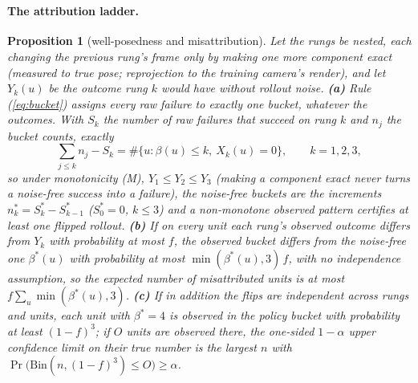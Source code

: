 \documentclass{article}
\newtheorem{proposition}{Proposition}
\newcommand{\ph}{\textsuperscript{\dag}}
\begin{document}
\paragraph{The attribution ladder\ph.}

\begin{proposition}[well-posedness and misattribution]
\label{prop:ladder}
Let the rungs be nested, each changing the previous rung's frame only by making one more component exact (measured
to true pose; reprojection to the training camera's render), and let $Y_k(u)$ be the outcome rung $k$ would have
without rollout noise. \textbf{(a)} Rule (\ref{eq:bucket}) assigns every raw failure to exactly one bucket, whatever
the outcomes. With $S_k$ the number of raw failures that succeed on rung $k$ and $n_j$ the bucket counts, exactly
\begin{equation}
\sum_{j \le k} n_j - S_k = \#\{u : \beta(u) \le k,\ X_k(u) = 0\}, \qquad k = 1,2,3,
\label{eq:ladderid}
\end{equation}
so under monotonicity (M), $Y_1 \le Y_2 \le Y_3$ (making a component exact never turns a noise-free success into a
failure), the noise-free buckets are the increments $n^*_k = S^*_k - S^*_{k-1}$ ($S^*_0 = 0$, $k \le 3$) and a non-monotone observed pattern
certifies at least one flipped rollout. \textbf{(b)} If on every unit each rung's observed outcome differs from $Y_k$ with probability
at most $f$, the observed bucket differs from the noise-free one $\beta^*(u)$ with probability at most
$\min(\beta^*(u), 3)\, f$, with no independence assumption, so the expected number of misattributed units is at most
$f \sum_u \min(\beta^*(u), 3)$. \textbf{(c)} If in addition the flips are independent across rungs and units, each unit with
$\beta^* = 4$ is observed in the policy bucket with probability at least $(1-f)^3$; if $O$ units are observed there,
the one-sided $1-\alpha$ upper confidence limit on their true number is the largest $n$ with
$\Pr\big(\mathrm{Bin}(n, (1-f)^3) \le O\big) \ge \alpha$.
\end{proposition}
\end{document}
